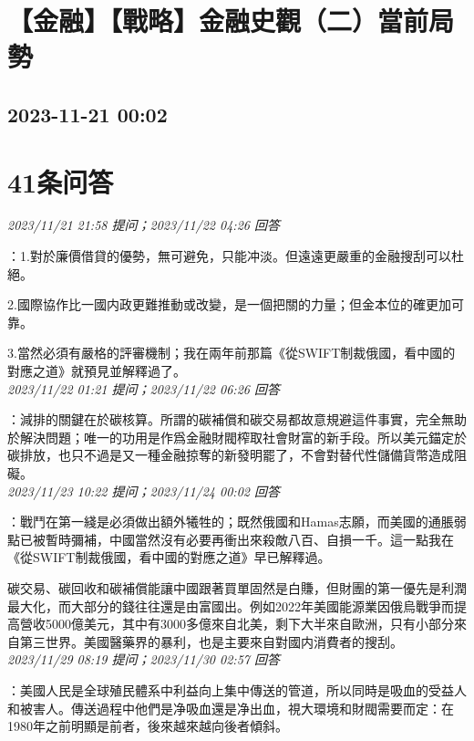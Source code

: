 \documentclass[twocolumn]{ctexart}
\begin{document}
\section{【金融】【戰略】金融史觀（二）當前局勢}
\subsection{2023-11-21 00:02}


\section{41条问答}

\textit{\hfill\noindent\small 2023/11/21 21:58 提问；2023/11/22 04:26 回答}

：1.對於廉價借貸的優勢，無可避免，只能冲淡。但遠遠更嚴重的金融搜刮可以杜絕。

2.國際協作比一國内政更難推動或改變，是一個把關的力量；但金本位的確更加可靠。

3.當然必須有嚴格的評審機制；我在兩年前那篇《從SWIFT制裁俄國，看中國的對應之道》就預見並解釋過了。
\\

\textit{\hfill\noindent\small 2023/11/22 01:21 提问；2023/11/22 06:26 回答}

：減排的關鍵在於碳核算。所謂的碳補償和碳交易都故意規避這件事實，完全無助於解決問題；唯一的功用是作爲金融財閥榨取社會財富的新手段。所以美元錨定於碳排放，也只不過是又一種金融掠奪的新發明罷了，不會對替代性儲備貨幣造成阻礙。
\\

\textit{\hfill\noindent\small 2023/11/23 10:22 提问；2023/11/24 00:02 回答}

：戰鬥在第一綫是必須做出額外犧牲的；既然俄國和Hamas志願，而美國的通脹弱點已被暫時彌補，中國當然沒有必要再衝出來殺敵八百、自損一千。這一點我在《從SWIFT制裁俄國，看中國的對應之道》早已解釋過。

碳交易、碳回收和碳補償能讓中國跟著買單固然是白賺，但財團的第一優先是利潤最大化，而大部分的錢往往還是由富國出。例如2022年美國能源業因俄烏戰爭而提高營收5000億美元，其中有3000多億來自北美，剩下大半來自歐洲，只有小部分來自第三世界。美國醫藥界的暴利，也是主要來自對國内消費者的搜刮。
\\

\textit{\hfill\noindent\small 2023/11/29 08:19 提问；2023/11/30 02:57 回答}

：美國人民是全球殖民體系中利益向上集中傳送的管道，所以同時是吸血的受益人和被害人。傳送過程中他們是净吸血還是净出血，視大環境和財閥需要而定：在1980年之前明顯是前者，後來越來越向後者傾斜。
\end{document}
